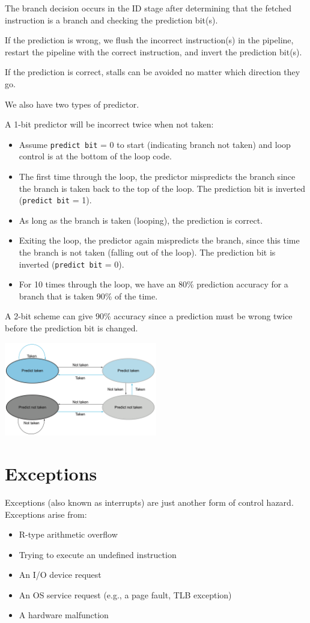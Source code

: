 The branch decision occurs in the ID stage after determining that the fetched instruction is a branch and checking the prediction bit(s).

If the prediction is wrong, we flush the incorrect instruction(s) in the pipeline, restart the pipeline with the correct instruction, and invert the prediction bit(s).

If the prediction is correct, stalls can be avoided no matter which direction they go.

We also have two types of predictor. 

A 1-bit predictor will be incorrect twice when not taken:
\begin{itemize}
  \item Assume \texttt{predict bit} = 0 to start (indicating branch not taken) and loop control is at the bottom of the loop code.
  \item The first time through the loop, the predictor mispredicts the branch since the branch is taken back to the top of the loop. The prediction bit is inverted (\texttt{predict bit} = 1).
  \item As long as the branch is taken (looping), the prediction is correct.
  \item Exiting the loop, the predictor again mispredicts the branch, since this time the branch is not taken (falling out of the loop). The prediction bit is inverted (\texttt{predict bit} = 0).
  \item For 10 times through the loop, we have an 80\% prediction accuracy for a branch that is taken 90\% of the time.
\end{itemize}

A 2-bit scheme can give 90\% accuracy since a prediction must be wrong twice before the prediction bit is changed.
\begin{center}
  \includegraphics[width=0.5\textwidth]{Figure/branch_prediction.png}
\end{center}

\section{Exceptions}
Exceptions (also known as interrupts) are just another form of control hazard. Exceptions arise from:
\begin{itemize}
  \item R-type arithmetic overflow
  \item Trying to execute an undefined instruction
  \item An I/O device request
  \item An OS service request (e.g., a page fault, TLB exception)
  \item A hardware malfunction
\end{itemize}

